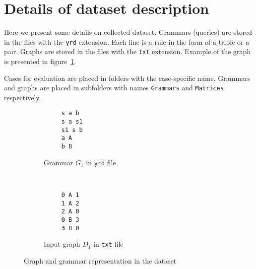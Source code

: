 \section{Details of dataset description}

Here we present some details on collected dataset.
Grammars (queries) are stored in the files with the \verb|yrd| extension.
Each line is a rule in the form of a triple or a pair.
Graphs are stored in the files with the \verb|txt| extension.
Example of the graph is presented in figure~\ref{fig:graph_example}.

Cases for evaluation are placed in folders with the case-specific name.
Grammars and graphs are placed in subfolders with names \verb|Grammars| and \verb|Matrices| respectively.

\begin{figure}[h!]
    \centering
    \begin{subfigure}[b]{0.24\textwidth}
        \centering
        \begin{verbatim}
     s a b
     s a s1
     s1 s b
     a A
     b B
        \end{verbatim}
        \caption{Grammar $G_1$ in \texttt{yrd} file}
    \end{subfigure}%
    ~
    \begin{subfigure}[b]{0.20\textwidth}
        \centering
         \begin{verbatim}
     0 A 1
     1 A 2
     2 A 0
     0 B 3
     3 B 0
 \end{verbatim}

        \caption{Input graph $D_1$ in \texttt{txt} file}
    \end{subfigure}
    \caption{Graph and grammar representation in the dataset}
    \label{fig:graph_example}
\end{figure}
